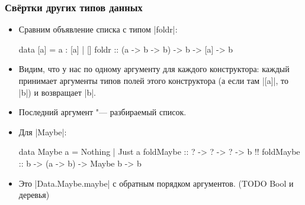 \documentclass[11pt]{beamer}
\begin{document}
\begin{frame}[fragile]
  \frametitle{Свёртки других типов данных}
  \begin{itemize}
    \item Сравним объявление списка с типом \haskinline|foldr|:
          \begin{haskellsmall}
            data [a] = a : [a]       | []
            foldr ::  (a -> b -> b) -> b -> [a] -> b
          \end{haskellsmall}
    \item Видим, что у нас по одному аргументу для каждого конструктора: каждый принимает аргументы типов полей этого конструктора (а если там \haskinline|[a]|, то \haskinline|b|) и возвращает \haskinline|b|.
    \item Последний аргумент "--- разбираемый список.
    \item Для \haskinline|Maybe|:
          \begin{haskellsmall}
            data Maybe a = Nothing | Just a
            foldMaybe ::   ?      -> ?        -> ?       -> b !\pause!
            foldMaybe ::   b      -> (a -> b) -> Maybe b -> b
          \end{haskellsmall}
          \pause
    \item Это \haskinline|Data.Maybe.maybe| с обратным порядком аргументов. (TODO Bool и деревья)  %
  \end{itemize}
\end{frame}
\end{document}
